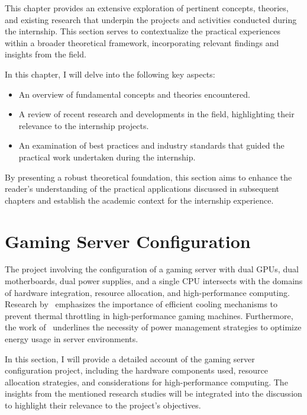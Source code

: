 This chapter provides an extensive exploration of pertinent concepts, theories, and existing research that underpin the projects and activities conducted during the internship. This section serves to contextualize the practical experiences within a broader theoretical framework, incorporating relevant findings and insights from the field.

In this chapter, I will delve into the following key aspects:

\begin{itemize}
    \item An overview of fundamental concepts and theories encountered.
    \item A review of recent research and developments in the field, highlighting their relevance to the internship projects.
    \item An examination of best practices and industry standards that guided the practical work undertaken during the internship.
\end{itemize}

By presenting a robust theoretical foundation, this section aims to enhance the reader's understanding of the practical applications discussed in subsequent chapters and establish the academic context for the internship experience.

\section{Gaming Server Configuration}

The project involving the configuration of a gaming server with dual GPUs, dual motherboards, dual power supplies, and a single CPU intersects with the domains of hardware integration, resource allocation, and high-performance computing. Research by~\cite{ramakrishnan2021cpu} emphasizes the importance of efficient cooling mechanisms to prevent thermal throttling in high-performance gaming machines. Furthermore, the work of~\cite{bianchini2004power} underlines the necessity of power management strategies to optimize energy usage in server environments.

In this section, I will provide a detailed account of the gaming server configuration project, including the hardware components used, resource allocation strategies, and considerations for high-performance computing. The insights from the mentioned research studies will be integrated into the discussion to highlight their relevance to the project's objectives.



